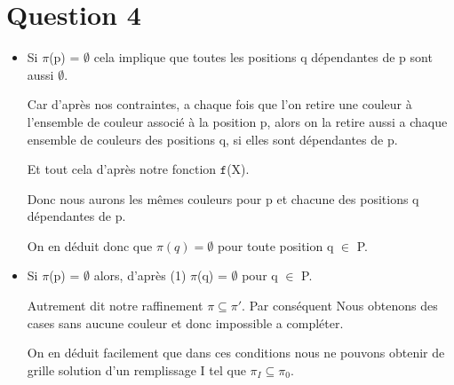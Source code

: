 
\section{Question 4}

\bigskip
\begin{itemize}
\item Si $\pi$(p) = $\emptyset$ cela implique que toutes les positions q d\'ependantes de p sont aussi $\emptyset$. 

Car d'apr\`es nos contraintes, a chaque fois que l'on retire une couleur \`a l'ensemble de couleur associ\'e \`a la position p, alors on la retire aussi a chaque ensemble de couleurs des positions q, si elles sont d\'ependantes de p. 

Et tout cela d'apr\`es notre fonction $\mathtt{f}$(X). 

Donc nous aurons les m\^emes couleurs pour p et chacune des positions q d\'ependantes de p.

\bigskip
On en d\'eduit donc que $\pi(q)=\emptyset$ pour toute position q $\in$ P.

\bigskip
\item Si $\pi$(p) = $\emptyset$ alors, d'apr\`es (1) $\pi$(q) = $\emptyset$ pour q $\in$ P. 

Autrement dit notre raffinement $\pi \subseteq \pi'$. Par cons\'equent Nous obtenons des cases sans aucune couleur et donc impossible a compl\'eter. 

\bigskip
On en d\'eduit facilement que dans ces conditions nous ne pouvons obtenir de grille solution d'un remplissage I tel que $\pi_I \subseteq \pi_0$.
\end{itemize}